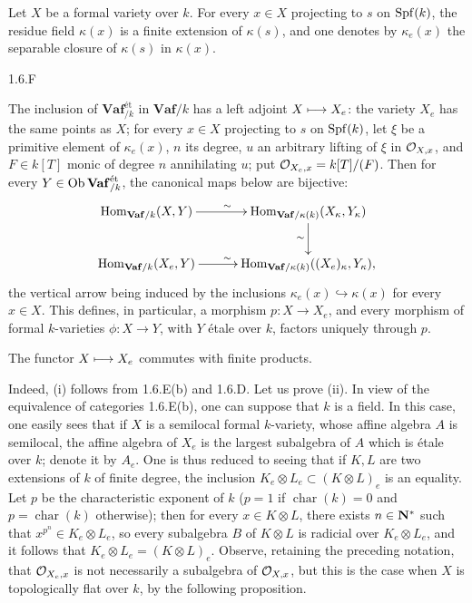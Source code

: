 Let $X$ be a formal variety over $k$. For every $x\in X$ projecting to $s$ on $\operatorname{Spf}(k)$, the residue field $\kappa(x)$ is a finite extension of $\kappa(s)$, and one denotes by $\kappa_e(x)$ the separable closure of $\kappa(s)$ in $\kappa(x)$.
\begin{proposition}{1.6.F}\label{VIIB.1.6.F}
\begin{enumeratei}
\item The inclusion of $\mathbf{Vaf}_{/k}^{\text{ét}}$ in $\mathbf{Vaf}/k$ has a left adjoint $X\longmapsto X_e$: the variety $X_e$ has the same points as $X$; for every $x\in X$ projecting to $s$ on $\operatorname{Spf}(k)$, let $\xi$ be a primitive element of $\kappa_e(x)$, $n$ its degree, $u$ an arbitrary lifting of $\xi$ in $\mathcal{O}_{X,x}$, and $F\in k[T]$ monic of degree $n$ annihilating $u$; put $\mathcal{O}_{X_e,x}=k[T]/(F)$. Then for every $Y\in\operatorname{Ob}\mathbf{Vaf}_{/k}^{\text{ét}}$, the canonical maps below are bijective:
\[
\xymatrix@C=30pt{
\Hom_{\mathbf{Vaf}/k}(X,Y)\ar[r]^\sim&\Hom_{\mathbf{Vaf}/\kappa(k)}(X_\kappa,Y_\kappa)\ar[d]_\sim\\
\Hom_{\mathbf{Vaf}/k}(X_e,Y)\ar[r]^\sim&\Hom_{\mathbf{Vaf}/\kappa(k)}((X_e)_\kappa,Y_\kappa),}
\]
the vertical arrow being induced by the inclusions $\kappa_e(x)\hookrightarrow\kappa(x)$ for every $x\in X$. This defines, in particular, a morphism $p:X\to X_e$, and every morphism of formal $k$-varieties $\phi:X\to Y$, with $Y$ étale over $k$, factors uniquely through $p$.
\item The functor $X\longmapsto X_e$ commutes with finite products.
\end{enumeratei}
\end{proposition}
Indeed, (i) follows from 1.6.E(b) and 1.6.D. Let us prove (ii). In view of the equivalence of categories 1.6.E(b), one can suppose that $k$ is a field. In this case, one easily sees that if $X$ is a semilocal formal $k$-variety, \ie whose affine algebra $A$ is semilocal, the affine algebra of $X_e$ is the largest subalgebra of $A$ which is étale over $k$; denote it by $A_e$. One is thus reduced to seeing that if $K,L$ are two extensions of $k$ of finite degree, the inclusion $K_e\otimes L_e\subset(K\otimes L)_e$ is an equality. Let $p$ be the characteristic exponent of $k$ (\ie $p=1$ if $\operatorname{char}(k)=0$ and $p=\operatorname{char}(k)$ otherwise); then for every $x\in K\otimes L$, there exists $n\in\mathbf{N}^*$ such that $x^{p^n}\in K_e\otimes L_e$, so every subalgebra $B$ of $K\otimes L$ is radicial over $K_e\otimes L_e$, and it follows that $K_e\otimes L_e=(K\otimes L)_e$.
Observe, retaining the preceding notation, that $\mathcal{O}_{X_e,x}$ is not necessarily a subalgebra of $\mathcal{O}_{X,x}$, but this is the case when $X$ is topologically flat over $k$, by the following proposition.

